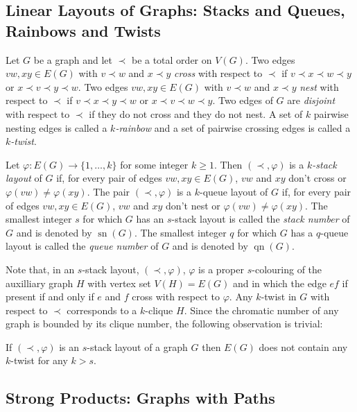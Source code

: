 \documentclass[kpfonts]{patmorin}
\DeclareMathOperator{\sn}{sn}
\DeclareMathOperator{\qn}{qn}
\begin{document}
\subsection{Linear Layouts of Graphs: Stacks and Queues, Rainbows and Twists}

Let $G$ be a graph and let $\prec$ be a total order on $V(G)$.  Two edges $vw,xy\in E(G)$ with $v\prec w$ and $x\prec y$ \emph{cross} with respect to $\prec$ if $v\prec x\prec w\prec y$ or $x\prec v\prec y\prec w$. Two edges $vw,xy\in E(G)$ with $v\prec w$ and $x\prec y$ \emph{nest} with respect to $\prec$ if $v\prec x\prec y\prec w$ or $x\prec v\prec w\prec y$.  Two edges of $G$ are \emph{disjoint} with respect to $\prec$ if they do not cross and they do not nest. A set of $k$ pairwise nesting edges is called a \emph{$k$-rainbow} and a set of pairwise crossing edges is called a \emph{$k$-twist}.

Let $\varphi:E(G)\to\{1,\ldots,k\}$ for some integer $k\ge 1$.  Then $(\prec,\varphi)$ is a \emph{$k$-stack layout} of $G$ if, for every pair of edges $vw,xy\in E(G)$, $vw$ and $xy$ don't cross or $\varphi(vw)\neq\varphi(xy)$. The pair $(\prec,\varphi)$ is a $k$-queue layout of $G$ if, for every pair of edges $vw,xy\in E(G)$, $vw$ and $xy$ don't nest or $\varphi(vw)\neq\varphi(xy)$.  The smallest integer $s$ for which $G$ has an $s$-stack layout is called the \emph{stack number} of $G$ and is denoted by $\sn(G)$.  The smallest integer $q$ for which $G$ has a $q$-queue layout is called the \emph{queue number} of $G$ and is denoted by $\qn(G)$.  

Note that, in an $s$-stack layout, $(\prec,\varphi)$, $\varphi$ is a proper $s$-colouring of the auxilliary graph $H$ with vertex set $V(H)=E(G)$ and in which the edge $ef$ if present if and only if $e$ and $f$ cross with respect to $\varphi$.  Any $k$-twist in $G$ with respect to $\prec$ corresponds to a $k$-clique $H$.  Since the chromatic number of any graph is bounded by its clique number, the following observation is trivial:

\begin{obs}
  If $(\prec,\varphi)$ is an $s$-stack layout of a graph $G$ then $E(G)$ does not contain any $k$-twist for any $k>s$.
\end{obs}


\subsection{Strong Products: Graphs with Paths}
\end{document}
